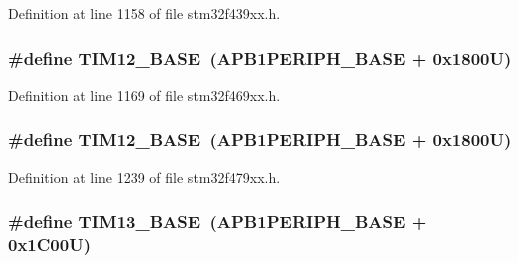Definition at line 1158 of file stm32f439xx.\+h.

\subsubsection[{\texorpdfstring{T\+I\+M12\+\_\+\+B\+A\+SE}{TIM12_BASE}}]{\setlength{\rightskip}{0pt plus 5cm}\#define T\+I\+M12\+\_\+\+B\+A\+SE~({\bf A\+P\+B1\+P\+E\+R\+I\+P\+H\+\_\+\+B\+A\+SE} + 0x1800\+U)}\hypertarget{group___peripheral__memory__map_ga33dea32fadbaecea161c2ef7927992fd}{}\label{group___peripheral__memory__map_ga33dea32fadbaecea161c2ef7927992fd}


Definition at line 1169 of file stm32f469xx.\+h.

\subsubsection[{\texorpdfstring{T\+I\+M12\+\_\+\+B\+A\+SE}{TIM12_BASE}}]{\setlength{\rightskip}{0pt plus 5cm}\#define T\+I\+M12\+\_\+\+B\+A\+SE~({\bf A\+P\+B1\+P\+E\+R\+I\+P\+H\+\_\+\+B\+A\+SE} + 0x1800\+U)}\hypertarget{group___peripheral__memory__map_ga33dea32fadbaecea161c2ef7927992fd}{}\label{group___peripheral__memory__map_ga33dea32fadbaecea161c2ef7927992fd}


Definition at line 1239 of file stm32f479xx.\+h.

\subsubsection[{\texorpdfstring{T\+I\+M13\+\_\+\+B\+A\+SE}{TIM13_BASE}}]{\setlength{\rightskip}{0pt plus 5cm}\#define T\+I\+M13\+\_\+\+B\+A\+SE~({\bf A\+P\+B1\+P\+E\+R\+I\+P\+H\+\_\+\+B\+A\+SE} + 0x1\+C00\+U)}\hypertarget{group___peripheral__memory__map_gad20f79948e9359125a40bbf6ed063590}{}\label{group___peripheral__memory__map_gad20f79948e9359125a40bbf6ed063590}


